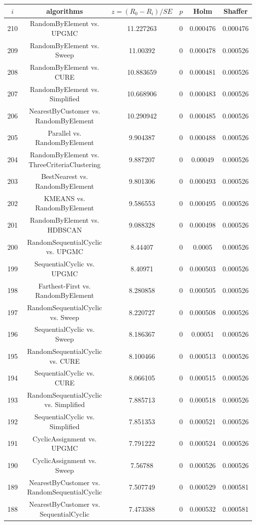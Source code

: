 \documentclass[a4paper,10pt]{article}
\begin{document}
\begin{landscape}
\begin{table}[!htp]
\centering\scriptsize
\begin{tabular}{cccccc}
$i$&algorithms&$z=(R_0 - R_i)/SE$&$p$&Holm&Shaffer\\
\hline210&RandomByElement vs. UPGMC&11.227263&0&0.000476&0.000476\\
209&RandomByElement vs. Sweep&11.00392&0&0.000478&0.000526\\
208&RandomByElement vs. CURE&10.883659&0&0.000481&0.000526\\
207&RandomByElement vs. Simplified&10.668906&0&0.000483&0.000526\\
206&NearestByCustomer vs. RandomByElement&10.290942&0&0.000485&0.000526\\
205&Parallel vs. RandomByElement&9.904387&0&0.000488&0.000526\\
204&RandomByElement vs. ThreeCriteriaClustering&9.887207&0&0.00049&0.000526\\
203&BestNearest vs. RandomByElement&9.801306&0&0.000493&0.000526\\
202&KMEANS vs. RandomByElement&9.586553&0&0.000495&0.000526\\
201&RandomByElement vs. HDBSCAN&9.088328&0&0.000498&0.000526\\
200&RandomSequentialCyclic vs. UPGMC&8.44407&0&0.0005&0.000526\\
199&SequentialCyclic vs. UPGMC&8.40971&0&0.000503&0.000526\\
198&Farthest-First vs. RandomByElement&8.280858&0&0.000505&0.000526\\
197&RandomSequentialCyclic vs. Sweep&8.220727&0&0.000508&0.000526\\
196&SequentialCyclic vs. Sweep&8.186367&0&0.00051&0.000526\\
195&RandomSequentialCyclic vs. CURE&8.100466&0&0.000513&0.000526\\
194&SequentialCyclic vs. CURE&8.066105&0&0.000515&0.000526\\
193&RandomSequentialCyclic vs. Simplified&7.885713&0&0.000518&0.000526\\
192&SequentialCyclic vs. Simplified&7.851353&0&0.000521&0.000526\\
191&CyclicAssignment vs. UPGMC&7.791222&0&0.000524&0.000526\\
190&CyclicAssignment vs. Sweep&7.56788&0&0.000526&0.000526\\
189&NearestByCustomer vs. RandomSequentialCyclic&7.507749&0&0.000529&0.000581\\
188&NearestByCustomer vs. SequentialCyclic&7.473388&0&0.000532&0.000581\\

\end{tabular}
\end{table}
\end{landscape}
\end{document}
